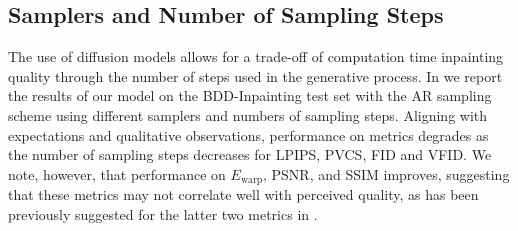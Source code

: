 \subsection{Samplers and Number of Sampling Steps}
The use of diffusion models allows for a trade-off of computation time \vs inpainting quality through the number of steps used in the generative process. In  we report the results of our model on the BDD-Inpainting test set with the AR sampling scheme using different samplers and numbers of sampling steps. Aligning with expectations and qualitative observations, performance on metrics degrades as the number of sampling steps decreases for LPIPS, PVCS, FID and VFID. We note, however, that performance on $E_\text{warp}$, PSNR, and SSIM improves, suggesting that these metrics may not correlate well with perceived quality, as has been previously suggested for the latter two metrics in \citet{perceptual}.

